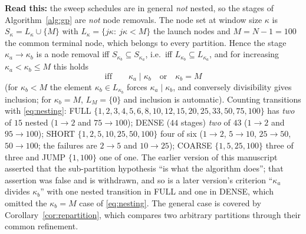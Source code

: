 \documentclass[11pt]{article}
\theoremstyle{remark}\newtheorem{remark}{Remark}
\newcommand{\readthis}[1]{\textbf{Read this:} #1}
\begin{document}
\readthis{the sweep schedules are in general \emph{not} nested, so the stages of Algorithm~\ref{alg:gp} are \emph{not} node removals. The node set at window size $\kappa$ is $S_\kappa=L_\kappa\cup\{M\}$ with $L_\kappa=\{j\kappa:\ j\kappa<M\}$ the launch nodes and $M=N-1=100$ the common terminal node, which belongs to every partition. Hence the stage $\kappa_a\to\kappa_b$ is a node removal iff $S_{\kappa_b}\subseteq S_{\kappa_a}$, i.e.\ iff $L_{\kappa_b}\subseteq L_{\kappa_a}$, and for increasing $\kappa_a<\kappa_b\le M$ this holds
\begin{equation}
\text{iff}\qquad \kappa_a\mid\kappa_b\quad\text{or}\quad\kappa_b=M
\label{eq:nesting}
\end{equation}
(for $\kappa_b<M$ the element $\kappa_b\in L_{\kappa_b}$ forces $\kappa_a\mid\kappa_b$, and conversely divisibility gives inclusion; for $\kappa_b=M$, $L_M=\{0\}$ and inclusion is automatic). Counting transitions with \eqref{eq:nesting}: FULL $\{1,2,3,4,5,6,8,10,12,15,20,25,33,50,75,100\}$ has \emph{two} of $15$ nested ($1\to2$ and $75\to100$); DENSE ($44$ stages) \emph{two} of $43$ ($1\to2$ and $95\to100$); SHORT $\{1,2,5,10,25,50,100\}$ four of six ($1\to2$, $5\to10$, $25\to50$, $50\to100$; the failures are $2\to5$ and $10\to25$); COARSE $\{1,5,25,100\}$ three of three and JUMP $\{1,100\}$ one of one. The earlier version of this manuscript asserted that the sub-partition hypothesis ``is what the algorithm does''; that assertion was false and is withdrawn, and so is a later version's criterion ``$\kappa_a$ divides $\kappa_b$'' with one nested transition in FULL and one in DENSE, which omitted the $\kappa_b=M$ case of \eqref{eq:nesting}. The general case is covered by Corollary~\ref{cor:repartition}, which compares two arbitrary partitions through their common refinement.}
\end{document}

